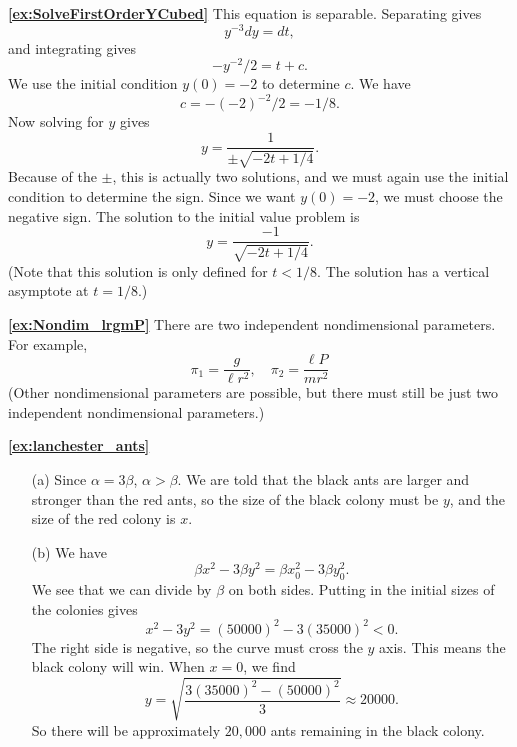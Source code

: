 \medskip
\textbf{\ref{ex:SolveFirstOrderYCubed}}
This equation is separable.  Separating gives
\[
   y^{-3}dy = dt,
\]
and integrating gives
\[
  -y^{-2}/2 = t + c.
\]
We use the initial condition $y(0)=-2$ to determine $c$.
We have
\[
  c = -(-2)^{-2}/2 = -1/8.
\]
Now solving for $y$ gives
\[
  y = \frac{1}{\pm\sqrt{-2t+1/4}}.
\]
Because of the $\pm$, this is actually two solutions, and we must again use
the initial condition to determine the sign.  Since we want $y(0)=-2$, we must
choose the negative sign.  The solution to the initial value problem is
\[
  y = \frac{-1}{\sqrt{-2t+1/4}}.
\]
(Note that this solution is only defined for $t < 1/8$.  The
solution has a vertical asymptote at $t=1/8$.)

\medskip
\textbf{\ref{ex:Nondim_lrgmP}}
There are two independent nondimensional parameters.
For example,
\[
   \pi_1 = \frac{g}{\ell r^2}, \quad \pi_2 = \frac{\ell P}{mr^2}
\]
(Other nondimensional parameters are possible, but there
must still be just two independent nondimensional parameters.)


\newpage
\textbf{\ref{ex:lanchester_ants}}
\begin{enumerate}
\item[(a)] Since $\alpha = 3\beta$, $\alpha > \beta$.
We are told that the black ants are larger and stronger than
the red ants, so the size of the black colony must be $y$,
and the size of the red colony is $x$.
\item[(b)] We have
\[
   \beta x^2 - 3\beta y^2 = \beta x_0^2 -3\beta y_0^2.
\]
We see that we can divide by $\beta$ on both sides.
Putting in the initial sizes of the colonies gives
\[
   x^2-3y^2 = (50000)^2-3(35000)^2 < 0.
\]
The right side is negative, so the curve must cross the $y$
axis. This means the black colony will win.
  When $x=0$, we find
\[
  y = \sqrt{\frac{3(35000)^2-(50000)^2}{3}} \approx 20000.
\]
So there will be approximately $20,000$ ants remaining in
the black colony.
\end{enumerate}

